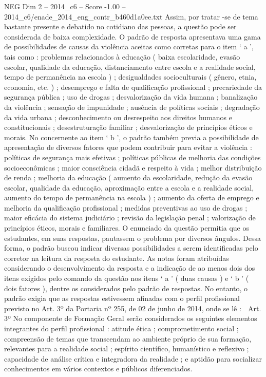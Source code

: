\begin{textsample}{NEG Dim 2 – 2014\_c6 – Score -1.00 – 2014\_c6/enade\_2014\_eng\_contr\_b460d1a0ee.txt}
Assim, por tratar -se de tema bastante presente e debatido no cotidiano das pessoas, a questão pode ser considerada de baixa complexidade.
O padrão de resposta apresentava uma gama de possibilidades de causas da violência aceitas como corretas para o item ‘ a ’, tais como : problemas relacionados à educação ( baixa escolaridade, evasão escolar, qualidade da educação, distanciamento entre escola e a realidade social, tempo de permanência na escola ) ; desigualdades socioculturais ( gênero, etnia, economia, etc. ) ; desemprego e falta de qualificação profissional ; precariedade da segurança pública ; uso de drogas ; desvalorização da vida humana ; banalização da violência ; sensação de impunidade ; ausência de políticas sociais ; degradação da vida urbana ; desconhecimento ou desrespeito aos direitos humanos e constitucionais ; desestruturação familiar ; desvalorização de princípios éticos e morais.
No concernente ao item ‘ b ’, o padrão também previa a possibilidade de apresentação de diversos fatores que podem contribuir para evitar a violência : políticas de segurança mais efetivas ; políticas públicas de melhoria das condições socioeconômicas ; maior consciência cidadã e respeito à vida ; melhor distribuição de renda ; melhoria da educação ( aumento da escolaridade, redução da evasão escolar, qualidade da educação, aproximação entre a escola e a realidade social, aumento do tempo de permanência na escola ) ; aumento da oferta de emprego e melhoria da qualificação profissional ; medidas preventivas ao uso de drogas ; maior eficácia do sistema judiciário ; revisão da legislação penal ; valorização de princípios éticos, morais e familiares.
O enunciado da questão permitia que os estudantes, em suas respostas, pautassem o problema por diversos ângulos.
Dessa forma, o padrão buscou indicar diversas possibilidades a serem identificadas pelo corretor na leitura da resposta do estudante.
As notas foram atribuídas considerando o desenvolvimento da resposta e a indicação de ao menos dois dos itens exigidos pelo comando da questão nos itens ‘ a ’ ( duas causas ) e ‘ b ’ ( dois fatores ), dentre os considerados pelo padrão de respostas.
No entanto, o padrão exigia que as respostas estivessem afinadas com o perfil profissional previsto no Art. 3º da Portaria nº 255, de 02 de junho de 2014, onde se lê :  Art. 3º No componente de Formação Geral serão considerados os seguintes elementos integrantes do perfil profissional : atitude ética ; comprometimento social ; compreensão de temas que transcendam ao ambiente próprio de sua formação, relevantes para a realidade social ; espírito científico, humanístico e reflexivo ; capacidade de análise crítica e integradora da realidade ; e aptidão para socializar conhecimentos em vários contextos e públicos diferenciados.

\end{textsample}

